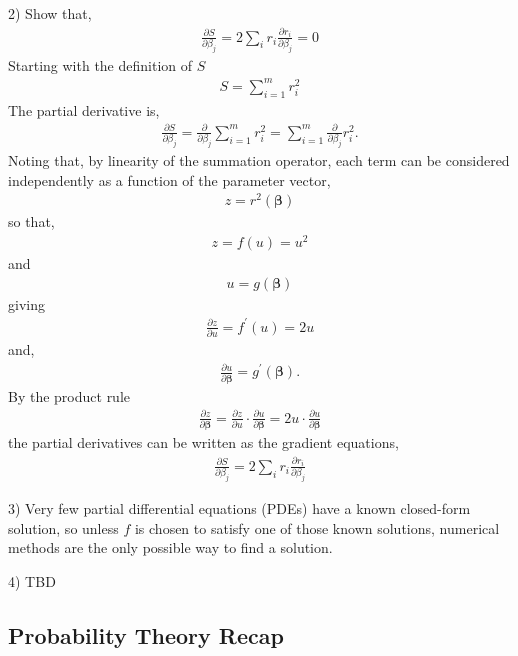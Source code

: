 2) Show that,
\begin{align}
\frac{\partial S}{\partial\beta_{j}} = 2\sum_{i}^{}r_{i}\frac{\partial r_{i}}{\partial\beta_{j}} = 0
\end{align}
Starting with the definition of \(S\)
\begin{align}
S = \sum_{i = 1}^{m}r_{i}^{2}
\end{align}
The partial derivative is,
\begin{align}
\frac{\partial S}{\partial\beta_{j}} = \frac{\partial}{\partial\beta_{j}}\sum_{i = 1}^{m}r_{i}^{2} = \sum_{i = 1}^{m}{\frac{\partial}{\partial\beta_{j}}r_{i}^{2}}.
\end{align}
Noting that, by linearity of the summation operator, each term can be
considered independently as a function of the parameter vector,
\begin{align}
z = r^{2}(\boldsymbol{\beta})
\end{align}
so that,
\begin{align}
z = f(u) = u^{2}
\end{align}
and
\begin{align}
u = g(\boldsymbol{\beta})
\end{align}
giving
\begin{align}
\frac{\partial z}{\partial u} = f^{\prime}(u) = 2u
\end{align}
and,
\begin{align}
\frac{\partial u}{\partial\boldsymbol{\beta}} = g^{\prime}\left( \boldsymbol{\beta} \right).
\end{align}
By the product rule
\begin{align}
\frac{\partial z}{\partial\boldsymbol{\beta}} = \frac{\partial z}{\partial u} \cdot \frac{\partial u}{\partial\boldsymbol{\beta}} = 2u \cdot \frac{\partial u}{\partial\boldsymbol{\beta}}
\end{align}
the partial derivatives can be written as the gradient equations,
\begin{align}
\frac{\partial S}{\partial\beta_{j}} = 2\sum_{i}^{}r_{i}\frac{\partial r_{i}}{\partial\beta_{j}}
\end{align}

3) Very few partial differential equations (PDEs) have a known
closed-form solution, so unless \(f\) is chosen to satisfy one of those
known solutions, numerical methods are the only possible way to find a
solution.

4) TBD

\subsection{Probability Theory Recap}

